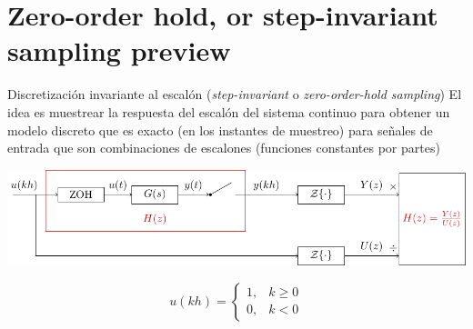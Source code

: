 \documentclass[presentation,aspectratio=169]{beamer}
\begin{document}
\section{Zero-order hold, or step-invariant sampling preview}
\label{sec:org36d6c12}
\begin{frame}[label={sec:orgd16ef30}]{Discretización invariante al escalón (\emph{step-invariant} o \emph{zero-order-hold sampling})}
El idea es muestrear la respuesta del escalón del sistema continuo para obtener un modelo discreto que es \alert{exacto} (en los instantes de muestreo) para señales de entrada que son combinaciones de escalones (funciones constantes por partes)

\begin{center}
\includegraphics[width=0.99\linewidth]{../../figures/invariant-sampling.pdf}
\end{center}

\[ u(kh) = \begin{cases} 1, & k \ge 0\\0, & k<0 \end{cases} \]
\end{frame}
\end{document}

